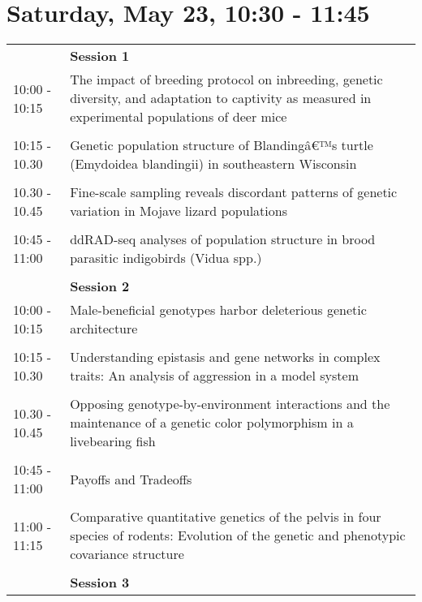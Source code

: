 \documentclass{article}
\begin{document}
\section{Saturday, May 23, 10:30 - 11:45}
\begin{longtabu} to \textwidth {lX}
 & \textbf{Session 1} \\ 

10:00 - 10:15 & The impact of breeding protocol on inbreeding, genetic diversity, and adaptation to captivity as measured in experimental populations of deer mice \\ 
 &  \\ 
10:15 - 10.30 & Genetic population structure of Blandingâ€™s turtle (Emydoidea blandingii) in southeastern Wisconsin \\ 
 &  \\ 
10.30 - 10.45 & Fine-scale sampling reveals discordant patterns of genetic variation in Mojave lizard populations \\ 
 &  \\ 
10:45 - 11:00 & ddRAD-seq analyses of population structure in brood parasitic indigobirds (Vidua spp.) \\ 
 &  \\ 
 & \textbf{Session 2} \\ 

10:00 - 10:15 & Male-beneficial genotypes harbor deleterious genetic architecture \\ 
 &  \\ 
10:15 - 10.30 & Understanding epistasis and gene networks in complex traits: An analysis of aggression in a model system \\ 
 &  \\ 
10.30 - 10.45 & Opposing genotype-by-environment interactions and the maintenance of a genetic color polymorphism in a livebearing fish \\ 
 &  \\ 
10:45 - 11:00 & Payoffs and Tradeoffs \\ 
 &  \\ 
11:00 - 11:15 & Comparative quantitative genetics of the pelvis in four species of rodents: Evolution of the genetic and phenotypic covariance structure \\ 
 &  \\ 
 & \textbf{Session 3} \\ 


\end{longtabu}
\end{document}
